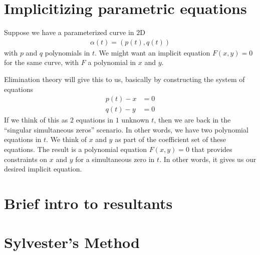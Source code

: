 \section{Implicitizing parametric equations}


Suppose we have a parameterized curve in $2$D
\begin{align*}
  \alpha(t) = (p(t), q(t))
\end{align*}
with $p$ and $q$ polynomials in $t$. We might want an implicit
equation $F(x, y) = 0$ for the same curve, with $F$ a polynomial in
$x$ and $y$.

Elimination theory will give this to us, basically by constructing the
system of equations
\begin{align*}
  p(t) - x &= 0 \\
  q(t) - y &= 0
\end{align*}
If we think of this as $2$ equations in $1$ unknown $t$, then we are
back in the ``singular simultaneous zeros'' scenario. In other words,
we have two polynomial equations in $t$. We think of $x$ and $y$ as
part of the coefficient set of these equations. The result is a
polynomial equation $F(x, y) = 0$ that provides constraints on $x$ and
$y$ for a simultaneous zero in $t$. In other words, it gives us  our
desired implicit equation.

\section{Brief intro to resultants}

\section{Sylvester's Method}



